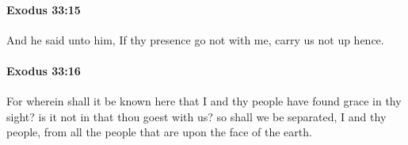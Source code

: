 		\paragraph{Exodus 33:15} %
			\label{EXODUS-33-15}

			And he said unto him, If thy presence go not with me, carry us not up hence.


		\paragraph{Exodus 33:16} %
			\label{EXODUS-33-16}

			For wherein shall it be known here that I and thy people have found grace in thy sight? is it not in that thou goest with us? so shall we be separated, I and thy people, from all the people that are upon the face of the earth.


